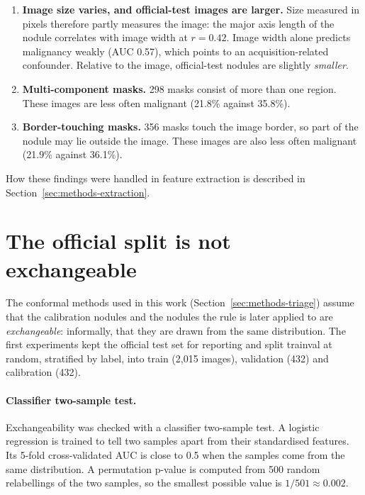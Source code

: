 \begin{enumerate}
  \item \textbf{Image size varies, and official-test images are larger.} Size measured in pixels
        therefore partly measures the image: the major axis length of the nodule correlates with
        image width at $r = 0.42$. Image width alone predicts malignancy weakly (AUC 0.57), which
        points to an acquisition-related confounder. Relative to the image, official-test
        nodules are slightly \emph{smaller}.
  \item \textbf{Multi-component masks.} 298 masks consist of more than one region. These images
        are less often malignant (21.8\% against 35.8\%).
  \item \textbf{Border-touching masks.} 356 masks touch the image border, so part of the nodule
        may lie outside the image. These images are also less often malignant (21.9\% against
        36.1\%).
\end{enumerate}

How these findings were handled in feature extraction is described in
Section~\ref{sec:methods-extraction}.

\section{The official split is not exchangeable}
\label{sec:data-official}

The conformal methods used in this work (Section~\ref{sec:methods-triage}) assume that the
calibration nodules and the nodules the rule is later applied to are
\emph{exchangeable}: informally, that they are drawn from the same distribution. The first
experiments kept the official test set for reporting and split trainval at random, stratified by
label, into train (2,015 images), validation (432) and calibration (432).

\paragraph{Classifier two-sample test.} Exchangeability was checked with a classifier two-sample
test. A logistic regression is trained to tell two samples apart from their standardised
features. Its 5-fold cross-validated AUC is close to 0.5 when the samples come from the same
distribution. A permutation p-value is computed from 500 random relabellings of the two samples,
so the smallest possible value is $1/501 \approx 0.002$.


